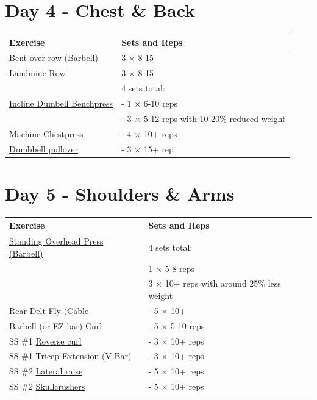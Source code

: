 \documentclass[11pt]{article}
\begin{document}
\section*{Day 4 - Chest \& Back}
\begin{center}
\begin{tabular}{|l|l|}
\hline
\textbf{Exercise} & \textbf{Sets and Reps}\\
\hline
\href{https://www.youtube.com/shorts/3OAG3sTlljk}{Bent over row (Barbell)} & 3 $\times$ 8-15 \\
\hline
\href{https://www.youtube.com/shorts/djvBoUaGDes}{Landmine Row} & 3 $\times$ 8-15 \\
\hline
& 4 sets total: \\
\href{https://www.youtube.com/watch?v=0f6-uCUKqgA}{Incline Dumbell Benchpress} & - 1  $\times$ 6-10 reps \\
& - 3  $\times$ 5-12 reps with 10-20\% reduced weight \\
\hline
\href{https://www.youtube.com/watch?v=dQw4w9WgXcQ}{Machine Chestpress} & - 4 $\times$ 10+ reps \\
\hline
\href{https://www.youtube.com/watch?v=FK4rHfWKEac}{Dumbbell pullover} & - 3 $\times$ 15+ rep\\
\hline
\end{tabular}
\end{center}

\section*{Day 5 - Shoulders \& Arms}
\begin{center}
\begin{tabular}{|l|l|}
\hline
\textbf{Exercise} & \textbf{Sets and Reps}\\
\hline
\href{https://www.youtube.com/watch?v=OSJsEPfEcU0}{Standing Overhead Press (Barbell)} & 4 sets total: \\
& 1 $\times$ 5-8 reps \\
& 3 $\times$ 10+ reps with around 25\% less weight \\
\hline
\href{https://www.youtube.com/watch?v=JENKmsEZQO8}{Rear Delt Fly (Cable} & - 5 $\times$ 10+ \\
\hline
\href{https://www.youtube.com/watch?v=bAWLx7PPK10}{Barbell (or EZ-bar) Curl} & - 5 $\times$ 5-10 reps \\
\hline
SS \#1 \href{https://www.youtube.com/shorts/zuUo-wwFQGw}{Reverse curl} & - 3 $\times$ 10+ reps \\
SS \#1 \href{https://www.youtube.com/watch?v=cGi9eO3QnOA}{Tricep Extension (V-Bar)} & - 3 $\times$ 10+ reps \\
\hline
SS \#2 \href{https://www.youtube.com/watch?v=n5dsI9qQXwY}{Lateral raise} & - 5 $\times$ 10+ reps\\
SS \#2 \href{https://www.youtube.com/watch?v=d_KZxkY_0cM}{Skullcrushers}  & - 5 $\times$ 10+ reps\\
\hline


\end{tabular}
\end{center}
\end{document}

